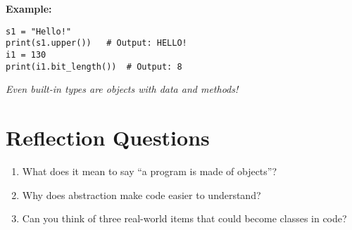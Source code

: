 \textbf{Example:}
\begin{verbatim}
s1 = "Hello!"
print(s1.upper())   # Output: HELLO!
i1 = 130
print(i1.bit_length())  # Output: 8
\end{verbatim}

\textit{Even built-in types are objects with data and methods!}

\section{Reflection Questions}

\begin{enumerate}
  \item What does it mean to say “a program is made of objects”?
  \item Why does abstraction make code easier to understand?
  \item Can you think of three real-world items that could become classes in code?
\end{enumerate}

